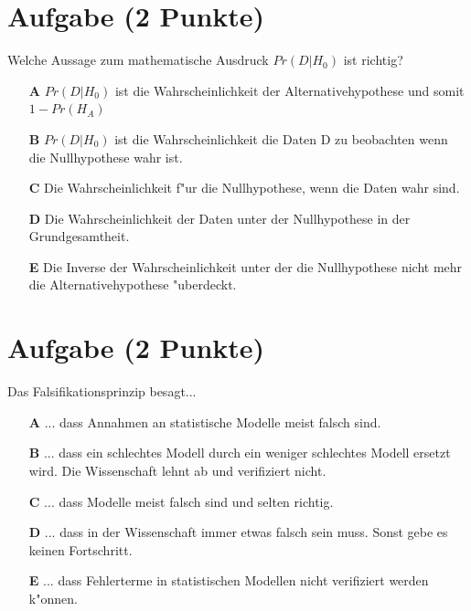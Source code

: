 \documentclass[a4paper, 10pt]{scrartcl}\usepackage[]{graphicx}\usepackage[]{xcolor}
\begin{document}
\section{Aufgabe \hfill (2 Punkte)}

Welche Aussage zum mathematische Ausdruck $Pr(D|H_0)$ ist richtig? 



\begin{enumerate}
\item [\textbf{A} \msquare] $Pr(D|H_0)$ ist die Wahrscheinlichkeit der Alternativehypothese und somit $1 - Pr(H_A)$
\item [\textbf{B} \msquare] $Pr(D|H_0)$ ist die Wahrscheinlichkeit die Daten D zu beobachten wenn die Nullhypothese wahr ist.
\item [\textbf{C} \msquare] Die Wahrscheinlichkeit f{"u}r die Nullhypothese, wenn die Daten wahr sind.
\item [\textbf{D} \msquare] Die Wahrscheinlichkeit der Daten unter der Nullhypothese in der Grundgesamtheit.
\item [\textbf{E} \msquare] Die Inverse der Wahrscheinlichkeit unter der die Nullhypothese nicht mehr die Alternativehypothese {"u}berdeckt.
\end{enumerate}

\section{Aufgabe \hfill (2 Punkte)}

Das Falsifikationsprinzip besagt... 



\begin{enumerate}
\item [\textbf{A} \msquare] ... dass Annahmen an statistische Modelle meist falsch sind.
\item [\textbf{B} \msquare] ... dass ein schlechtes Modell durch ein weniger schlechtes Modell ersetzt wird. Die Wissenschaft lehnt ab und verifiziert nicht.
\item [\textbf{C} \msquare] ... dass Modelle meist falsch sind und selten richtig.
\item [\textbf{D} \msquare] ... dass in der Wissenschaft immer etwas falsch sein muss. Sonst gebe es keinen Fortschritt.
\item [\textbf{E} \msquare] ... dass Fehlerterme in statistischen Modellen nicht verifiziert werden k{"o}nnen.
\end{enumerate}
\end{document}
